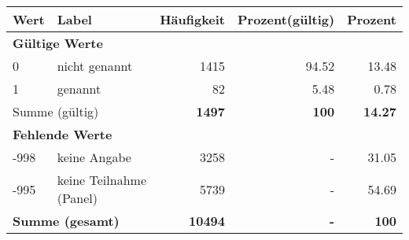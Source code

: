      \begin{longtable}{lXrrr}
     \toprule
     \textbf{Wert} & \textbf{Label} & \textbf{Häufigkeit} & \textbf{Prozent(gültig)} & \textbf{Prozent} \\
     \endhead
     \midrule
     \multicolumn{5}{l}{\textbf{Gültige Werte}}\\

     0 &
     \multicolumn{1}{X}{ nicht genannt   } &


       \num{1415} &
       \num[round-mode=places,round-precision=2]{94.52} &
         \num[round-mode=places,round-precision=2]{13.48} \\

     1 &
     \multicolumn{1}{X}{ genannt   } &


       \num{82} &
       \num[round-mode=places,round-precision=2]{5.48} &
         \num[round-mode=places,round-precision=2]{0.78} \\
     \midrule
     \multicolumn{2}{l}{Summe (gültig)} &
       \textbf{\num{1497}} &
     \textbf{\num{100}} &
       \textbf{\num[round-mode=places,round-precision=2]{14.27}} \\
     \multicolumn{5}{l}{\textbf{Fehlende Werte}}\\
       -998 &
       keine Angabe &
         \num{3258} &
        - &
         \num[round-mode=places,round-precision=2]{31.05} \\
       -995 &
       keine Teilnahme (Panel) &
         \num{5739} &
        - &
         \num[round-mode=places,round-precision=2]{54.69} \\
     \midrule
     \multicolumn{2}{l}{\textbf{Summe (gesamt)}} &
          \textbf{\num{10494}} &
        \textbf{-} &
        \textbf{\num{100}} \\
     \bottomrule
     \end{longtable}
     
